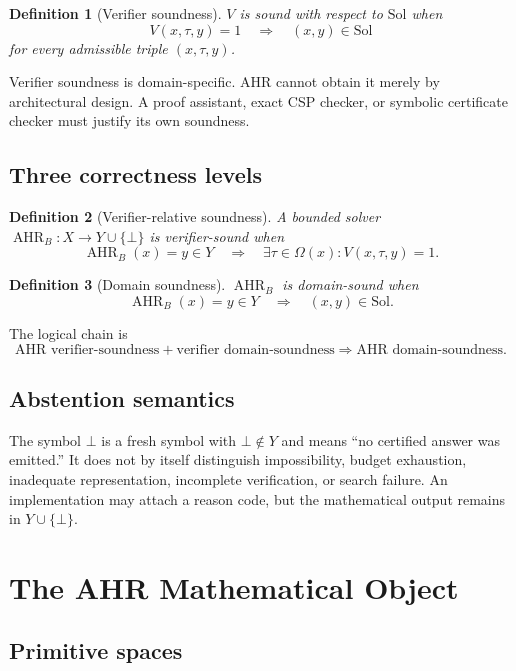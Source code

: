 \documentclass[11pt,oneside]{book}
\newtheorem{definition}{Definition}[chapter]
\theoremstyle{remark}
\newcommand{\AHR}{\operatorname{AHR}}
\newcommand{\Sol}{\mathrm{Sol}}
\newcommand{\Om}{\Omega}
\begin{document}
\begin{definition}[Verifier soundness]
$V$ is sound with respect to $\Sol$ when
\[
V(x,\tau,y)=1\quad\Longrightarrow\quad (x,y)\in\Sol
\]
for every admissible triple $(x,\tau,y)$.
\end{definition}

Verifier soundness is domain-specific. AHR cannot obtain it merely by architectural design. A proof assistant, exact CSP checker, or symbolic certificate checker must justify its own soundness.

\section{Three correctness levels}

\begin{definition}[Verifier-relative soundness]
A bounded solver $\AHR_B:X\to Y\cup\{\bot\}$ is verifier-sound when
\[
\AHR_B(x)=y\in Y\quad\Longrightarrow\quad
\exists\tau\in\Om(x):V(x,\tau,y)=1.
\]
\end{definition}

\begin{definition}[Domain soundness]
$\AHR_B$ is domain-sound when
\[
\AHR_B(x)=y\in Y\quad\Longrightarrow\quad (x,y)\in\Sol.
\]
\end{definition}

The logical chain is
\[
\boxed{
\text{AHR verifier-soundness}+\text{verifier domain-soundness}
\Longrightarrow\text{AHR domain-soundness}.}
\]

\section{Abstention semantics}

The symbol $\bot$ is a fresh symbol with $\bot\notin Y$ and means ``no
certified answer was emitted.'' It does not by itself distinguish
impossibility, budget exhaustion, inadequate representation, incomplete
verification, or search failure. An implementation may attach a reason code,
but the mathematical output remains in $Y\cup\{\bot\}$.

\chapter{The AHR Mathematical Object}

\section{Primitive spaces}
\end{document}
